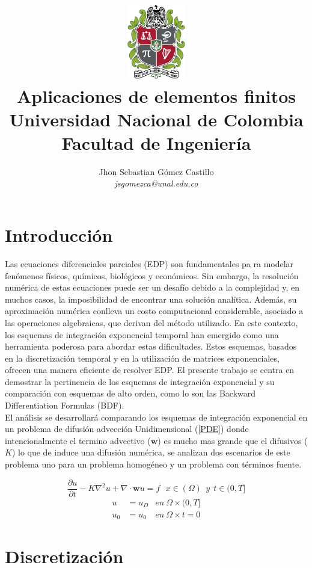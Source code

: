 \documentclass[11pt, spanish]{article}
\title{
    \vspace{-25mm}
    \includegraphics[width=1in]{Escudo_de_la_Universidad_Nacional_de_Colombia.png}\\ %
    Aplicaciones de elementos finitos\\
    \Large Universidad Nacional de Colombia\\ 
    Facultad de Ingenier\'ia
}
\author{Jhon Sebastian G\'omez Castillo\\
\textit{jsgomezca@unal.edu.co}
}
\begin{document}
\maketitle
\section{Introducci\'on}
Las ecuaciones diferenciales parciales (EDP) son fundamentales pa ra modelar fen\'omenos f\'isicos, qu\'imicos, biol\'ogicos y econ\'omicos. Sin embargo, la resoluci\'on num\'erica de estas ecuaciones puede ser un desaf\'io debido a la complejidad y, en muchos casos, la imposibilidad de encontrar una soluci\'on anal\'itica. Adem\'as, su aproximaci\'on num\'erica conlleva un costo computacional considerable, asociado a las operaciones algebraicas, que derivan del m\'etodo utilizado. En este contexto, los esquemas de integraci\'on exponencial temporal han emergido como una herramienta poderosa para abordar estas dificultades. Estos esquemas, basados en la discretizaci\'on temporal y en la utilizaci\'on de matrices exponenciales, ofrecen una manera eficiente de resolver EDP. El presente trabajo se centra en demostrar la pertinencia de los esquemas de integraci\'on exponencial y su comparaci\'on con esquemas de alto orden, como lo son las Backward Differentiation Formulas (BDF). \\

El an\'alisis se desarrollar\'a comparando los esquemas de integraci\'on exponencial en un problema de difusi\'on advecci\'on  Unidimensional  (\ref{PDE}) donde intencionalmente el termino advectivo ($\textbf{w}$) es mucho mas grande que el difusivos ($K$) lo que de induce una difusi\'on num\'erica, se analizan dos escenarios de este problema uno para un problema homog\'eneo y un problema con t\'erminos fuente.

\begin{equation}
	\frac{\partial u}{\partial t}-K\nabla^2 u + \nabla \cdot \textbf{w} u = f  \ \ \ x \in (\Omega) \ \  y \ \ t \in (0,T]
	\label{PDE}
\end{equation}
\begin{align*}
	u &= u_D &en \ \Omega \times( 0,T]   \\
	u_0 &=u_0 &en \ \Omega \times t=0 
\end{align*}

\section{Discretizaci\'on}  \label{esquemas}
\end{document}
